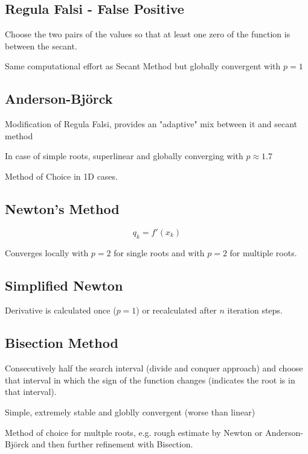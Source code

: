 \documentclass[
    a4paper,
    11pt
]{article}
\begin{document}
\subsection{Regula Falsi - False Positive}

Choose the two pairs of the values so that at least one zero of the function is
between the secant.

Same computational effort as Secant Method but globally convergent with $p=1$

\subsection{Anderson-Björck}

Modification of Regula Falsi, provides an "adaptive" mix between it and secant
method

In case of simple roots, superlinear and globally converging with $p \approx
1.7$

Method of Choice in 1D cases.

\subsection{Newton's Method}

\begin{equation}
    q_k = f'(x_k)
\end{equation}

Converges locally with $p=2$ for single roots and with $p=2$ for multiple roots.

\subsection{Simplified Newton}

Derivative is calculated once ($p=1$) or recalculated after $n$ iteration steps.

\subsection{Bisection Method}

Consecutively half the search interval (divide and conquer approach) and choose
that interval in which the sign of the function changes (indicates the root is
in that interval).

Simple, extremely stable and globlly convergent (worse than linear)

Method of choice for multple roots, e.g. rough estimate by Newton or
Anderson-Björck and then further refinement with Bisection.
\end{document}
